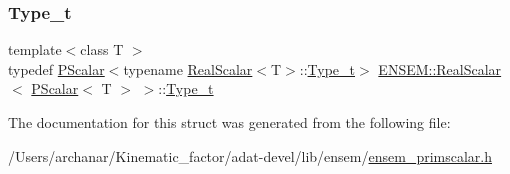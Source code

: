 \subsubsection{\texorpdfstring{Type\_t}{Type\_t}\hspace{0.1cm}{\footnotesize\ttfamily [3/3]}}
{\footnotesize\ttfamily template$<$class T $>$ \\
typedef \mbox{\hyperlink{classENSEM_1_1PScalar}{P\+Scalar}}$<$typename \mbox{\hyperlink{structENSEM_1_1RealScalar}{Real\+Scalar}}$<$T$>$\+::\mbox{\hyperlink{structENSEM_1_1RealScalar_3_01PScalar_3_01T_01_4_01_4_a904a917e492c04b2e0f09ff24b5c6f1c}{Type\+\_\+t}}$>$ \mbox{\hyperlink{structENSEM_1_1RealScalar}{E\+N\+S\+E\+M\+::\+Real\+Scalar}}$<$ \mbox{\hyperlink{classENSEM_1_1PScalar}{P\+Scalar}}$<$ T $>$ $>$\+::\mbox{\hyperlink{structENSEM_1_1RealScalar_3_01PScalar_3_01T_01_4_01_4_a904a917e492c04b2e0f09ff24b5c6f1c}{Type\+\_\+t}}}



The documentation for this struct was generated from the following file\+:\begin{DoxyCompactItemize}
\item 
/\+Users/archanar/\+Kinematic\+\_\+factor/adat-\/devel/lib/ensem/\mbox{\hyperlink{adat-devel_2lib_2ensem_2ensem__primscalar_8h}{ensem\+\_\+primscalar.\+h}}\end{DoxyCompactItemize}

